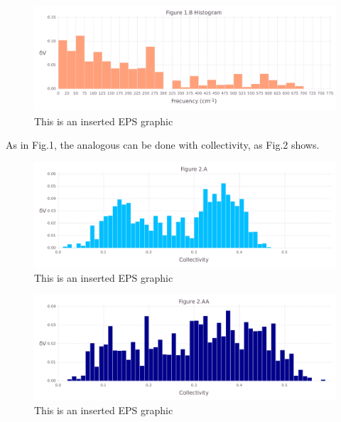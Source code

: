 \documentclass[10pt,letterpaper]{article}
\begin{document}
\begin{figure}[ht]
\begin{center}
\includegraphics[scale=0.5]{1m14/1bfigure.pdf}
\caption{This is an inserted EPS graphic}
\label{fig2}
\end{center}
\end{figure}

\clearpage
As in Fig.1, the analogous can be done with collectivity, as Fig.2 shows.

\begin{figure}[ht]
\begin{center}
\includegraphics[scale=0.5]{1m14/2afigure.pdf}
\caption{This is an inserted EPS graphic}
\label{fig3}
\end{center}
\end{figure}

\begin{figure}[ht]
\begin{center}
\includegraphics[scale=0.5]{1m14/2aafigure.pdf}
\caption{This is an inserted EPS graphic}
\label{fig4}
\end{center}
\end{figure}
\end{document}
